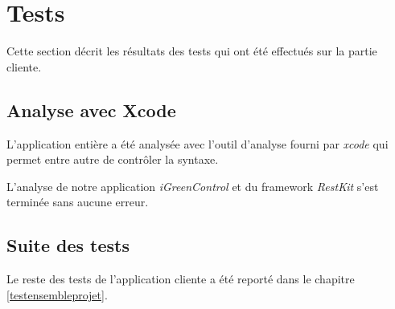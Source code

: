 
\section{Tests}

Cette section décrit les résultats des tests qui ont été effectués sur la partie cliente.

\subsection{Analyse avec Xcode} %
\label{sub:analyse_avec_xcode}

L'application entière a été analysée avec l'outil d'analyse fourni par \emph{\gls{xcode}} qui permet entre autre de contrôler la syntaxe.

\medskip

L'analyse de notre application \emph{iGreenControl} et du framework \emph{RestKit} s'est terminée sans aucune erreur.

\subsection{Suite des tests} %
\label{sub:suite_des_tests}
Le reste des tests de l'application cliente a été reporté dans le chapitre \ref{testensembleprojet}.

